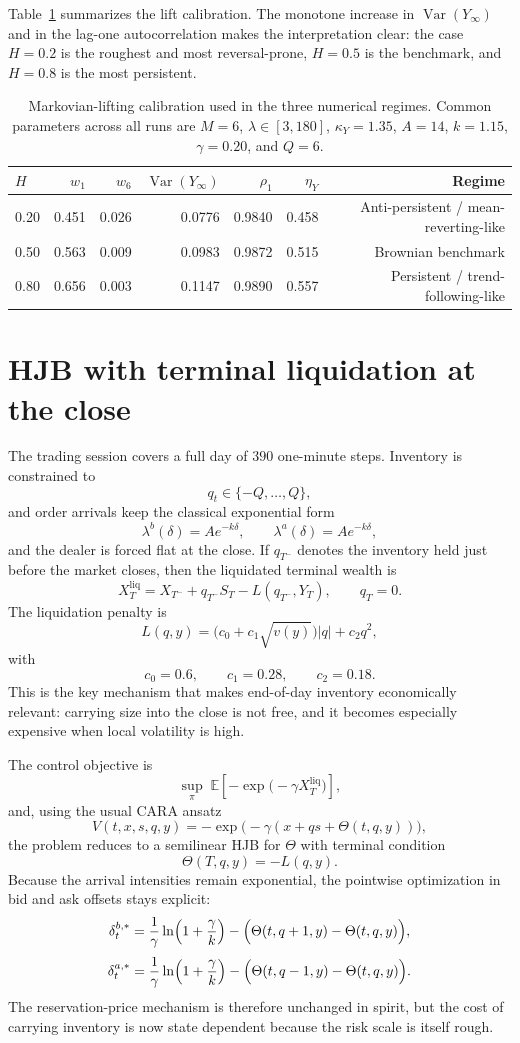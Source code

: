 \documentclass[a4paper,10pt,titlepage,oneside,openany]{book}
\theoremstyle{plain}
\theoremstyle{definition}
\theoremstyle{remark}
\newcommand{\Var}{\operatorname{Var}}
\newcommand{\1}{\mathbf{1}}
\begin{document}
Table~\ref{tab:hjb_calibration} summarizes the lift calibration. The monotone increase in \(\Var(Y_\infty)\) and in the lag-one autocorrelation makes the interpretation clear: the case \(H=0.2\) is the roughest and most reversal-prone, \(H=0.5\) is the benchmark, and \(H=0.8\) is the most persistent.

\begin{table}[H]
\centering
\caption{Markovian-lifting calibration used in the three numerical regimes. Common parameters across all runs are \(M=6\), \(\lambda \in [3,180]\), \(\kappa_Y=1.35\), \(A=14\), \(k=1.15\), \(\gamma=0.20\), and \(Q=6\).}
\label{tab:hjb_calibration}
\begin{tabular}{@{}lrrrrrr@{}}
\toprule
\(H\) & \(w_1\) & \(w_6\) & \(\Var(Y_\infty)\) & \(\rho_1\) & \(\eta_Y\) & Regime \\
\midrule
0.20 & 0.451 & 0.026 & 0.0776 & 0.9840 & 0.458 & Anti-persistent / mean-reverting-like \\
0.50 & 0.563 & 0.009 & 0.0983 & 0.9872 & 0.515 & Brownian benchmark \\
0.80 & 0.656 & 0.003 & 0.1147 & 0.9890 & 0.557 & Persistent / trend-following-like \\
\bottomrule
\end{tabular}
\end{table}

\section{HJB with terminal liquidation at the close}

The trading session covers a full day of \(390\) one-minute steps. Inventory is constrained to
\[
q_t\in\{-Q,\dots,Q\},
\]
and order arrivals keep the classical exponential form
\[
\lambda^b(\delta)=Ae^{-k\delta},
\qquad
\lambda^a(\delta)=Ae^{-k\delta},
\]
and the dealer is forced flat at the close. If \(q_{T^-}\) denotes the inventory held just before the market closes, then the liquidated terminal wealth is
\[
X_T^{\mathrm{liq}}
=
X_{T^-}+q_{T^-}S_T-L(q_{T^-},Y_T),
\qquad q_T=0.
\]
The liquidation penalty is
\[
L(q,y)=\bigl(c_0+c_1\sqrt{v(y)}\bigr)|q|+c_2q^2,
\]
with
\[
c_0=0.6,\qquad c_1=0.28,\qquad c_2=0.18.
\]
This is the key mechanism that makes end-of-day inventory economically relevant: carrying size into the close is not free, and it becomes especially expensive when local volatility is high.

The control objective is
\[
\sup_{\pi}\;\mathbb{E}\!\left[-\exp\!\bigl(-\gamma X_T^{\mathrm{liq}}\bigr)\right],
\]
and, using the usual CARA ansatz
\[
V(t,x,s,q,y)=-\exp\!\bigl(-\gamma(x+qs+\Theta(t,q,y))\bigr),
\]
the problem reduces to a semilinear HJB for \(\Theta\) with terminal condition
\[
\Theta(T,q,y)=-L(q,y).
\]
Because the arrival intensities remain exponential, the pointwise optimization in bid and ask offsets stays explicit:
\[
\delta_t^{b,*}
=
\frac{1}{\gamma}\ln\!\left(1+\frac{\gamma}{k}\right)
-\Bigl(\Theta(t,q+1,y)-\Theta(t,q,y)\Bigr),
\]
\[
\delta_t^{a,*}
=
\frac{1}{\gamma}\ln\!\left(1+\frac{\gamma}{k}\right)
-\Bigl(\Theta(t,q-1,y)-\Theta(t,q,y)\Bigr).
\]
The reservation-price mechanism is therefore unchanged in spirit, but the cost of carrying inventory is now state dependent because the risk scale is itself rough.
\end{document}
